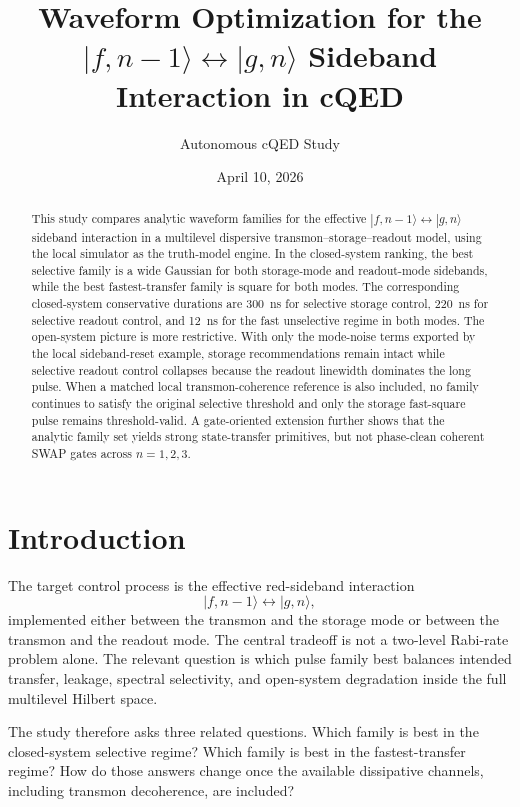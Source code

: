 \documentclass[11pt]{article}
\title{Waveform Optimization for the \texorpdfstring{$|f,n-1\rangle \leftrightarrow |g,n\rangle$}{|f,n-1> <-> |g,n>} Sideband Interaction in cQED}
\author{Autonomous cQED Study}
\date{April 10, 2026}
\begin{document}
\maketitle

\begin{abstract}
This study compares analytic waveform families for the effective
\(
|f,n-1\rangle \leftrightarrow |g,n\rangle
\)
sideband interaction in a multilevel dispersive transmon--storage--readout model, using the local simulator as the truth-model engine. In the closed-system ranking, the best selective family is a wide Gaussian for both storage-mode and readout-mode sidebands, while the best fastest-transfer family is square for both modes. The corresponding closed-system conservative durations are \SI{300}{ns} for selective storage control, \SI{220}{ns} for selective readout control, and \SI{12}{ns} for the fast unselective regime in both modes. The open-system picture is more restrictive. With only the mode-noise terms exported by the local sideband-reset example, storage recommendations remain intact while selective readout control collapses because the readout linewidth dominates the long pulse. When a matched local transmon-coherence reference is also included, no family continues to satisfy the original selective threshold and only the storage fast-square pulse remains threshold-valid. A gate-oriented extension further shows that the analytic family set yields strong state-transfer primitives, but not phase-clean coherent SWAP gates across \(n=1,2,3\).
\end{abstract}

\section{Introduction}
The target control process is the effective red-sideband interaction
\begin{equation}
|f,n-1\rangle \leftrightarrow |g,n\rangle,
\label{eq:sideband_target}
\end{equation}
implemented either between the transmon and the storage mode or between the transmon and the readout mode. The central tradeoff is not a two-level Rabi-rate problem alone. The relevant question is which pulse family best balances intended transfer, leakage, spectral selectivity, and open-system degradation inside the full multilevel Hilbert space.

The study therefore asks three related questions. Which family is best in the closed-system selective regime? Which family is best in the fastest-transfer regime? How do those answers change once the available dissipative channels, including transmon decoherence, are included?
\end{document}
